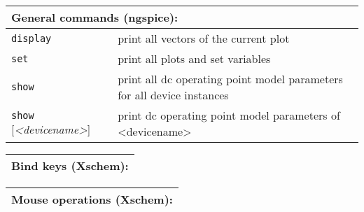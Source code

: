 \documentclass[10pt,a4paper]{article}
\newcommand{\mac}[1]{\texttt{#1}}
\newcommand{\argu}[1]{\textit{#1}}
\begin{document}
	\newpage
	
	\begin{tabular}{p{}p{}}
		\toprule
		\multicolumn{2}{l}{General commands (ngspice):}\\
		\midrule
		\mac{display} & print all vectors of the current plot\\
		\mac{set}	& print all plots and set variables\\
		\mac{show} & print all dc operating point model parameters for all device instances\\
		\mac{show} [\argu{<devicename>}] & print dc operating point model parameters of <devicename>\\
		\bottomrule
	\end{tabular}
	
	\newpage
	
	\begin{tabular}{p{}p{}}
		\toprule
		\multicolumn{2}{l}{Bind keys (Xschem):}\\
		\midrule
		\bottomrule
	\end{tabular}
	
	\newpage
	
	\begin{tabular}{p{}p{}}
		\toprule
		\multicolumn{2}{l}{Mouse operations (Xschem):}\\
		\midrule
		\bottomrule
	\end{tabular}
\end{document}
